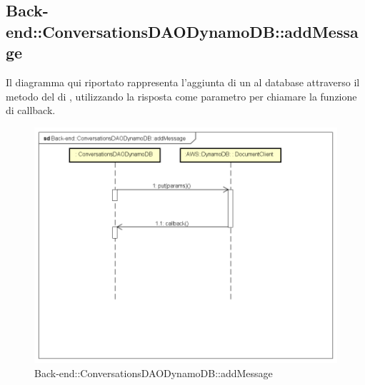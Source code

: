 \subsection{Back-end::ConversationsDAODynamoDB::addMessage}
Il diagramma qui riportato rappresenta l'aggiunta di un  al database attraverso il metodo  del  di , utilizzando la risposta come parametro per chiamare la funzione di callback.
 \begin{figure}[h] \centering \includegraphics[width=\textwidth,height=\textheight,keepaspectratio]{images/diagrams/back-end/Ufficial_Backend/Back-endConversationsDAODynamoDBaddMessage.png} 	\caption{Back-end::ConversationsDAODynamoDB::addMessage}
\end{figure}
\newpage

